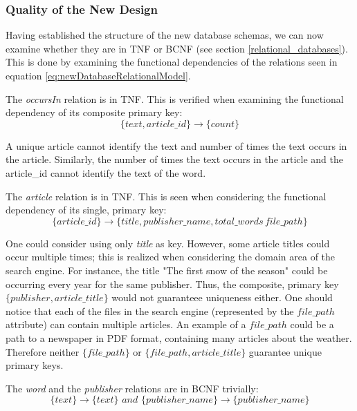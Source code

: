 \subsubsection*{Quality of the New Design}
Having established the structure of the new database schemas, we can now examine whether they are in TNF or BCNF (see section \ref{relational_databases}).
This is done by examining the functional dependencies of the relations seen in equation \ref{eq:newDatabaseRelationalModel}.

The \textit{occursIn} relation is in TNF. 
This is verified when examining the functional dependency of its composite primary key:
\begin{equation*}
 \{text,article\_id\}\rightarrow \{count\}   
\end{equation*}

A unique article cannot identify the text and number of times the text occurs in the article.
Similarly, the number of times the text occurs in the article and the article\_id cannot identify the text of the word.

The \textit{article} relation is in TNF. 
This is seen when considering the functional dependency of its single, primary key:
\begin{equation*}
    \{article\_id\} \rightarrow \{title, publisher\_name,total\_words\, file\_path\}
\end{equation*}

One could consider using only \textit{title} as key. 
However, some article titles could occur multiple times; this is realized when considering the domain area of the \knox{} search engine.
For instance, the title "The first snow of the season" could be occurring every year for the same publisher.
Thus, the composite, primary key $\{ publisher,article\_title \}$ would not guaranteee uniqueness either.
One should notice that each of the files in the search engine (represented by the $file\_path$ attribute) can contain multiple articles.
An example of a $file\_path$ could be a path to a newspaper in PDF format, containing many articles about the weather.
Therefore neither $\{file\_path\}$ or $\{ file\_path, article\_title \}$ guarantee unique primary keys.


The \textit{word} and the \textit{publisher} relations are in BCNF trivially:
\begin{equation*}
    \{ text\} \rightarrow \{text\} \textit{\ and\ } \{ publisher\_name \} \rightarrow \{ publisher\_name\}
\end{equation*}
